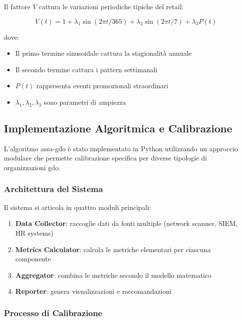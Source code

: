 Il fattore $V$ cattura le variazioni periodiche tipiche del retail:

\begin{equation}
V(t) = 1 + \lambda_1 \sin(2\pi t/365) + \lambda_2 \sin(2\pi t/7) + \lambda_3 P(t)
\end{equation}

dove:
\begin{itemize}
\item Il primo termine sinusoidale cattura la stagionalità annuale
\item Il secondo termine cattura i pattern settimanali
\item $P(t)$ rappresenta eventi promozionali straordinari
\item $\lambda_1, \lambda_2, \lambda_3$ sono parametri di ampiezza
\end{itemize}

\subsection{\texorpdfstring{Implementazione Algoritmica e Calibrazione}{2.3.2 - Implementazione Algoritmica e Calibrazione}}
\label{subsec:2.3.2_implementazione}

L'algoritmo \gls{assa-gdo} è stato implementato in Python utilizzando un approccio modulare che permette calibrazione specifica per diverse tipologie di organizzazioni \gls{gdo}.

\subsubsection{Architettura del Sistema}

Il sistema si articola in quattro moduli principali:

\begin{enumerate}
\item \textbf{Data Collector}: raccoglie dati da fonti multiple (network scanner, SIEM, HR systems)
\item \textbf{Metrics Calculator}: calcola le metriche elementari per ciascuna componente
\item \textbf{Aggregator}: combina le metriche secondo il modello matematico
\item \textbf{Reporter}: genera visualizzazioni e raccomandazioni
\end{enumerate}

\subsubsection{Processo di Calibrazione}

